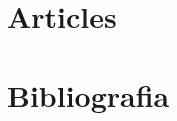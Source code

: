 \documentclass[12pt]{article}
\begin{document}

\clearpage
\section{Articles}



\clearpage
\section{Bibliografia}
\clearpage
\end{document}
